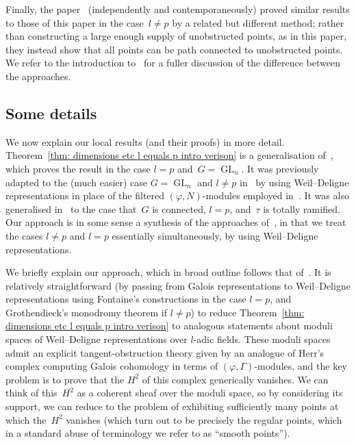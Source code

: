 \documentclass{amsart}
\theoremstyle{definition}
\theoremstyle{remark}
\DeclareMathOperator{\GL}{GL}
\begin{document}
Finally, the paper~\cite{2017arXiv170807434} (independently and
contemporaneously) proved similar results to those of this paper in
the case~$l\ne p$ by a related but different method; rather than
constructing a large enough supply of unobstructed points, as in this
paper, they instead show that all points can be path connected to
unobstructed points. We refer to the introduction
to~\cite{2017arXiv170807434} for a fuller discussion of the difference
between the approaches.

\subsection{Some details}\label{subsec: some details}
We now explain our local results (and their proofs) in more detail. Theorem~\ref{thm:
    dimensions etc l equals p intro verison} is a generalisation of~\cite[Thm.\ 3.3.4]{MR2373358}, which proves the result
in the case $l=p$ and~$G=\GL_n$. It was previously adapted to the
(much easier)
case $G=\GL_n$ and $l\ne p$ in~\cite{MR2785764} by using Weil--Deligne
representations in place of the filtered $(\varphi,N)$-modules
employed in~\cite{MR2373358}. It was also generalised
in~\cite{2014arXiv1403.1411B} to the case
that~$G$ is connected, $l=p$, and~$\tau$ is totally ramified. Our approach is in some sense a
synthesis of the approaches of~\cite{MR2785764,2014arXiv1403.1411B},
in that we treat the cases $l\ne p$ and $l=p$ essentially
simultaneously, by using Weil--Deligne representations.

We briefly explain our approach, which in broad outline follows that
of~\cite{MR2373358}. It is relatively straightforward (by passing from
Galois representations to Weil--Deligne representations using
Fontaine's constructions in the case $l=p$, and Grothendieck's
monodromy theorem if $l\ne p$) to reduce Theorem~\ref{thm: dimensions
  etc l equals p intro verison} to analogous statements about moduli
spaces of Weil--Deligne representations over $l$-adic fields. These
moduli spaces admit an explicit tangent-obstruction theory given by an
analogue of Herr's complex computing Galois cohomology in terms of
$(\varphi,\Gamma)$-modules, and the key problem is to prove that the
$H^2$ of this complex generically vanishes. We can think of this~$H^2$
as a coherent sheaf over the moduli space, so by considering its
support, we can reduce to the problem of exhibiting sufficiently many
points at which the~$H^2$ vanishes (which turn out to be precisely the
regular points, which in a standard abuse of terminology we refer to
as ``smooth points'').
\end{document}
